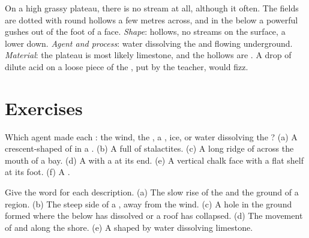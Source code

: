 \begin{example}
On a high grassy plateau, there is no stream at all, although it 
often. The fields are dotted with round hollows a few metres across, and in
the  below a powerful  gushes out of the foot of a  face.
\emph{Shape}: hollows, no streams on the surface, a  lower down.
\emph{Agent and process}: water dissolving the  and flowing
underground. \emph{Material}: the plateau is most likely limestone, and
the hollows are . A drop of dilute acid on a loose piece of the
, put by the teacher, would fizz.
\end{example}

\section{Exercises}

\begin{exercise}[$\star$]\label{exo:g9:landforms:1}
Which agent made each : the wind, the , a , ice, or water
dissolving the ? (a) A crescent-shaped  of  in a .
(b) A  full of stalactites. (c) A long ridge of  across the
mouth of a bay. (d) A  with a  at its end. (e) A
vertical chalk face with a flat  shelf at its foot. (f) A .
\end{exercise}

\begin{exercise}[$\star$]\label{exo:g9:landforms:2}
Give the word for each description. (a) The slow rise of the  and the
ground of a region. (b) The steep side of a , away from the wind.
(c) A hole in the ground formed where the  below has dissolved or a
 roof has collapsed. (d) The movement of  and  along the
shore. (e) A  shaped by water dissolving limestone.
\end{exercise}

